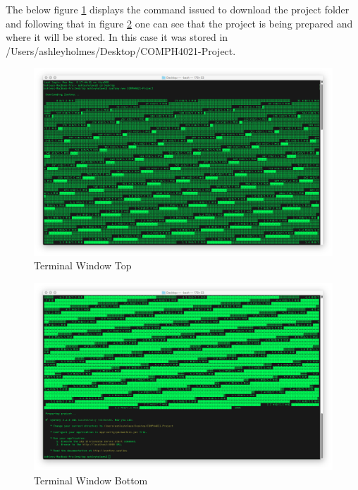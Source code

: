 The below figure \ref{fig:Terminal Window Top} displays the command issued to download the project folder and following that in figure \ref{fig:Terminal Window Bottom} one can see that the project is being prepared and where it will be stored. In this case it was stored in /Users/ashleyholmes/Desktop/COMPH4021-Project.

\begin{figure}[htbp]
   \centering
   \includegraphics[width=400pt]{figures/terminal_window_top.png} %
   \caption{Terminal Window Top}
   \label{fig:Terminal Window Top}
\end{figure}

\begin{figure}[htbp]
   \centering
   \includegraphics[width=400pt]{figures/terminal_window_bottom.png} %
   \caption{Terminal Window Bottom}
   \label{fig:Terminal Window Bottom}
\end{figure}

